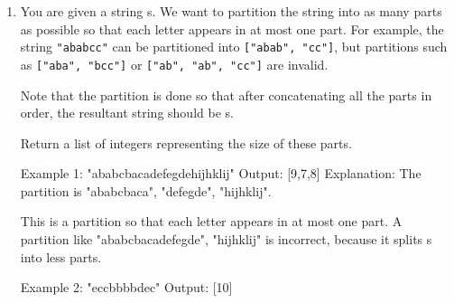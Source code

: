 \begin{enumerate}
\item {}

You are given a string s. We want to partition the string into as many parts as possible so that each letter appears in at most one part. For example, the string \texttt{"ababcc"} can be partitioned into \texttt{["abab", "cc"]}, but partitions such as \texttt{["aba", "bcc"]} or \texttt{["ab", "ab", "cc"]} are invalid.

Note that the partition is done so that after concatenating all the parts in order, the resultant string should be s.

Return a list of integers representing the size of these parts. 

\begin{console}
Example 1: "ababcbacadefegdehijhklij"
Output:    [9,7,8]
Explanation:
The partition is "ababcbaca", "defegde", "hijhklij".

This is a partition so that each letter appears in at most one part.
A partition like "ababcbacadefegde", "hijhklij" is incorrect, because it splits s into less parts.

Example 2: "eccbbbbdec"
Output:    [10]
\end{console}\newpage
\end{enumerate}
